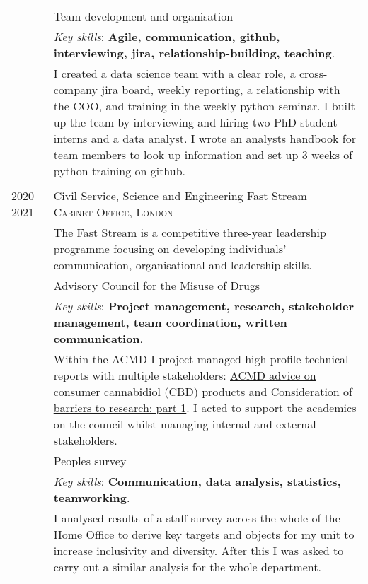\documentclass[a4paper,10pt]{article}
\newcommand{\tab}{\hspace{10 pt}}
\begin{document}
\begin{tabular}{p{2.25cm}|p{15cm}}
	 & \tab Team development and organisation\\
	 & \footnotesize{\emph{Key skills}: \textbf{Agile, communication, github, interviewing, jira, relationship-building, teaching}.}\\
	 & \footnotesize{I created a data science team with a clear role, a cross-company jira board, weekly reporting, a relationship with the COO, and training in the weekly python seminar. I built up the team by interviewing and hiring two PhD student interns and a data analyst. I wrote an analysts handbook for team members to look up information and set up 3 weeks of python training on github.} \vspace{0.05 in}\\		 
	 \multicolumn{2}{c}{} \\
%
%	 	 
	\textsc{2020--2021} & Civil Service, Science and Engineering Fast Stream -- \textsc{Cabinet Office, London}\\&\footnotesize{The \href{https://www.faststream.gov.uk/}{Fast Stream} is a competitive three-year leadership programme focusing on developing individuals' communication, organisational and leadership skills.}\\ 
	 & \tab \href{https://www.gov.uk/government/organisations/advisory-council-on-the-misuse-of-drugs}{Advisory Council for the Misuse of Drugs}\\
	 & \footnotesize{\emph{Key skills}: \textbf{Project management, research, stakeholder management, team coordination, written communication}.}\\
&	\footnotesize{Within the ACMD I project managed high profile technical reports with multiple stakeholders: \href{https://www.gov.uk/government/publications/acmd-advice-on-consumer-cannabidiol-cbd-products}{ACMD advice on consumer cannabidiol (CBD) products} and \href{https://www.gov.uk/government/publications/consideration-of-barriers-to-research-part-1}{Consideration of barriers to research: part 1}. I acted to support the academics on the council whilst managing internal and external stakeholders.}\vspace{0.05 in}\\
	 & \tab Peoples survey\\
	 & \footnotesize{\emph{Key skills}: \textbf{Communication, data analysis, statistics, teamworking}.}\\
	 &	\footnotesize{I analysed results of a staff survey across the whole of the Home Office to derive key targets and objects for my unit to increase inclusivity and diversity. After this I was asked to carry out a similar analysis for the whole department.}\vspace{0.05 in}\\	

\end{tabular}
\end{document}
